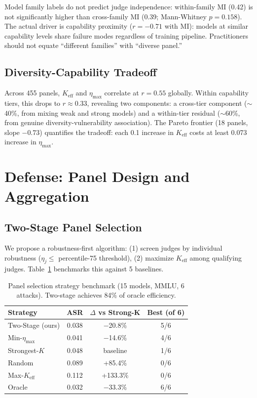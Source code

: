 \documentclass[11pt,a4paper]{article}
\newcommand{\keff}{K_{\text{eff}}}
\newcommand{\etamax}{\eta_{\text{max}}}
\begin{document}
Model family labels do not predict judge independence: within-family MI (0.42) is not significantly higher than cross-family MI (0.39; Mann-Whitney $p = 0.158$). The actual driver is capability proximity ($r = -0.71$ with MI): models at similar capability levels share failure modes regardless of training pipeline. Practitioners should not equate ``different families'' with ``diverse panel.''

\subsection{Diversity-Capability Tradeoff}

Across 455 panels, $\keff$ and $\etamax$ correlate at $r = 0.55$ globally. Within capability tiers, this drops to $r \approx 0.33$, revealing two components: a cross-tier component ($\sim$40\%, from mixing weak and strong models) and a within-tier residual ($\sim$60\%, from genuine diversity-vulnerability association). The Pareto frontier (18 panels, slope $-0.73$) quantifies the tradeoff: each 0.1 increase in $\keff$ costs at least 0.073 increase in $\etamax$.

\section{Defense: Panel Design and Aggregation}

\subsection{Two-Stage Panel Selection}

We propose a robustness-first algorithm: (1) screen judges by individual robustness ($\eta_j \leq$ percentile-75 threshold), (2) maximize $\keff$ among qualifying judges. Table~\ref{tab:defense} benchmarks this against 5 baselines.

\begin{table}[t]
\centering
\small
\caption{Panel selection strategy benchmark (15 models, MMLU, 6 attacks). Two-stage achieves 84\% of oracle efficiency.}
\label{tab:defense}
\begin{tabular}{lccc}
\toprule
Strategy & ASR & $\Delta$ vs Strong-K & Best (of 6) \\
\midrule
Two-Stage (ours) & 0.038 & $-$20.8\% & 5/6 \\
Min-$\etamax$ & 0.041 & $-$14.6\% & 4/6 \\
Strongest-$K$ & 0.048 & baseline & 1/6 \\
Random & 0.089 & +85.4\% & 0/6 \\
Max-$\keff$ & 0.112 & +133.3\% & 0/6 \\
Oracle & 0.032 & $-$33.3\% & 6/6 \\
\bottomrule
\end{tabular}
\end{table}
\end{document}
